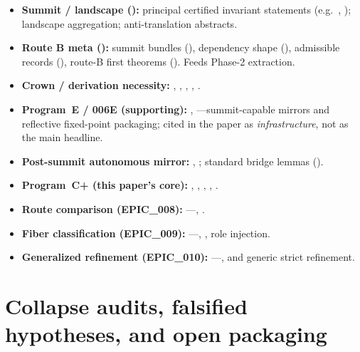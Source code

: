 \documentclass[11pt]{article}
\begin{document}
\begin{sloppypar}
\begin{itemize}
  \item \textbf{Summit / landscape ():} principal certified invariant statements (e.g.\ , ); landscape aggregation; anti-translation abstracts.
  \item \textbf{Route B meta ():} summit bundles (), dependency shape (), admissible records (), route-B first theorems (). Feeds Phase-2 extraction.
  \item \textbf{Crown / derivation necessity:} , , , , .
  \item \textbf{Program~E / 006E (supporting):} , ---summit-capable mirrors and reflective fixed-point packaging; cited in the paper as \emph{infrastructure}, not as the main headline.
  \item \textbf{Post-summit autonomous mirror:} , ; standard bridge lemmas ().
  \item \textbf{Program~C+ (this paper's core):} , , , , .
  \item \textbf{Route comparison (EPIC\_008):} ---, .
  \item \textbf{Fiber classification (EPIC\_009):} ---, , role injection.
  \item \textbf{Generalized refinement (EPIC\_010):} ---,  and generic strict refinement.
\end{itemize}
\end{sloppypar}

\section{Collapse audits, falsified hypotheses, and open packaging}\label{app:collapse-audits}
\end{document}
